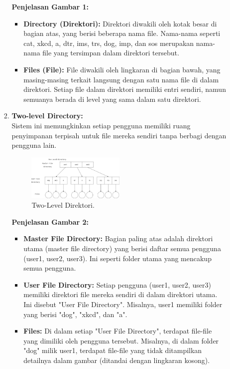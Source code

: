 \documentclass[12pt]{article}
\begin{document}
\begin{itemize}
\begin{enumerate}
\begin{enumerate}[label=\alph*.]
        \textbf{Penjelasan Gambar 1:}
        \begin{itemize}
            \item \textbf{Directory (Direktori):} Direktori diwakili oleh kotak besar di bagian atas, yang berisi beberapa nama file. Nama-nama seperti cat, xkcd, a, dtr, ims, trs, dog, imp, dan sos merupakan nama-nama file yang tersimpan dalam direktori tersebut.
            \item \textbf{Files (File):} File diwakili oleh lingkaran di bagian bawah, yang masing-masing terkait langsung dengan satu nama file di dalam direktori. Setiap file dalam direktori memiliki entri sendiri, namun semuanya berada di level yang sama dalam satu direktori.
        \end{itemize}

         \item \textbf{Two-level Directory:} \\
        Sistem ini memungkinkan setiap pengguna memiliki ruang penyimpanan terpisah untuk file mereka sendiri tanpa berbagi dengan pengguna lain.

        \begin{figure}[h]
        \centering
        \includegraphics[width=0.5\textwidth]{asset/gambar2.jpg}
        \caption{Two-Level Direktori.}
        \label{fig:two-level-direktori}
        \end{figure}

        \textbf{Penjelasan Gambar 2:}
        \begin{itemize}
            \item \textbf{Master File Directory:} Bagian paling atas adalah direktori utama (master file directory) yang berisi daftar semua pengguna (user1, user2, user3). Ini seperti folder utama yang mencakup semua pengguna.
            \item \textbf{User File Directory:} Setiap pengguna (user1, user2, user3) memiliki direktori file mereka sendiri di dalam direktori utama. Ini disebut "User File Directory". Misalnya, user1 memiliki folder yang berisi "dog", "xkcd", dan "a".
            \item \textbf{Files:} Di dalam setiap "User File Directory", terdapat file-file yang dimiliki oleh pengguna tersebut. Misalnya, di dalam folder "dog" milik user1, terdapat file-file yang tidak ditampilkan detailnya dalam gambar (ditandai dengan lingkaran kosong).
        \end{itemize}


\end{enumerate}
\end{enumerate}
\end{itemize}
\end{document}
